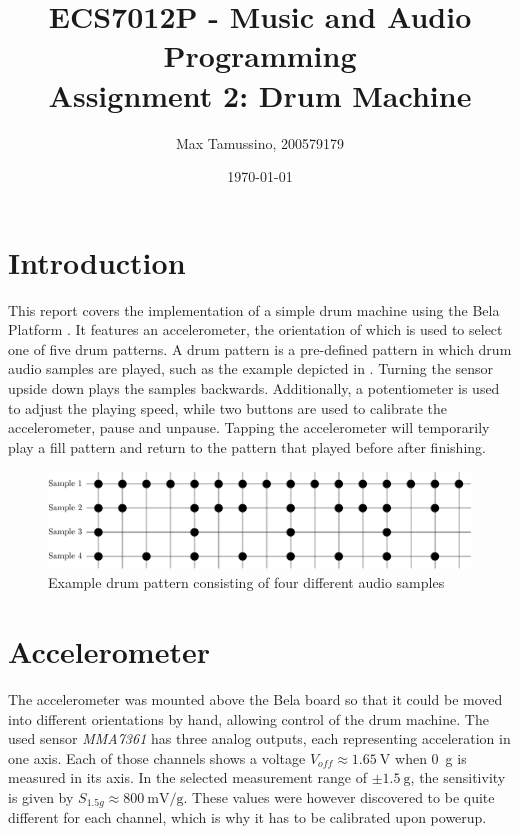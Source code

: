 \documentclass[a4paper, 12pt]{article}
\title{ECS7012P - Music and Audio Programming\\
	   Assignment 2: Drum Machine}
\author{
  Max Tamussino, 200579179
}
\date{\today}
\begin{document}
\maketitle
\tableofcontents
\pagebreak

\section{Introduction} \label{sec:intro}
This report covers the implementation of a simple drum machine using the Bela Platform \cite{McPherson2015}. It features an accelerometer, the orientation of which is used to select one of five drum patterns. A drum pattern is a pre-defined pattern in which drum audio samples are played, such as the example depicted in . Turning the sensor upside down plays the samples backwards. Additionally, a potentiometer is used to adjust the playing speed, while two buttons are used to calibrate the accelerometer, pause and unpause. Tapping the accelerometer will temporarily play a fill pattern and return to the pattern that played before after finishing.

\begin{figure}[h!]
	\centering
	\includegraphics[width=\textwidth]{patterns.png}
	\caption{Example drum pattern consisting of four different audio samples}
	\label{fig:drum-patterns}
\end{figure}

\section{Accelerometer}
The accelerometer was mounted above the Bela board so that it could be moved into different orientations by hand, allowing control of the drum machine. The used sensor \emph{MMA7361} \cite{Freescale2008} has three analog outputs, each representing acceleration in one axis. Each of those channels shows a voltage $V_{off} \approx \SI{1.65}{\volt}$ when \SI{0}{\gram} is measured in its axis. In the selected measurement range of $\pm \SI{1.5}{\gram}$, the sensitivity is given by $S_{1.5g} \approx \SI{800}{\milli\volt\per\gram}$. These values were however discovered to be quite different for each channel, which is why it has to be calibrated upon powerup. 
\end{document}
